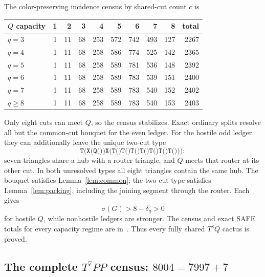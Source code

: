 \documentclass[11pt]{article}
\newcommand{\sig}{\sigma}
\begin{document}
The color-preserving incidence census by shared-cut count $c$ is
\begin{center}
\small
\begin{tabular}{lrrrrrrrr|r}
\toprule
$Q$ capacity&1&2&3&4&5&6&7&8&total\\
\midrule
$q=3$&1&11&68&253&572&742&493&127&2267\\
$q=4$&1&11&68&258&586&774&525&142&2365\\
$q=5$&1&11&68&258&589&781&536&148&2392\\
$q=6$&1&11&68&258&589&783&539&151&2400\\
$q=7$&1&11&68&258&589&783&540&152&2402\\
$q\geq8$&1&11&68&258&589&783&540&153&2403\\
\bottomrule
\end{tabular}
\end{center}
Only eight cuts can meet $Q$, so the census stabilizes.  Exact ordinary splits
resolve all but the common-cut bouquet for the even ledger.  For the hostile
odd ledger they can additionally leave the unique two-cut type
\[
 \texttt{T(X(Q())X(T()T()T()T()T()T()T()))}:
\]
seven triangles share a hub with a router triangle, and $Q$ meets that router
at its other cut.  In both unresolved types all eight triangles contain the
same hub.  The bouquet satisfies Lemma~\ref{lem:common}; the two-cut type
satisfies Lemma~\ref{lem:packing}, including the joining segment through the
router.  Each gives
\[
 \sig(G)>8-\delta_q>0
\]
for hostile $Q$, while nonhostile ledgers are stronger.  The census and exact
SAFE totals for every capacity regime are in~\cite{SharedCensus,SharedCode}.
Thus every fully shared $T^8Q$ cactus is proved.

\subsection{The complete \texorpdfstring{$T^7PP$}{T7PP} census:
\texorpdfstring{$8004=7997+7$}{8004 = 7997 + 7}}
\end{document}
